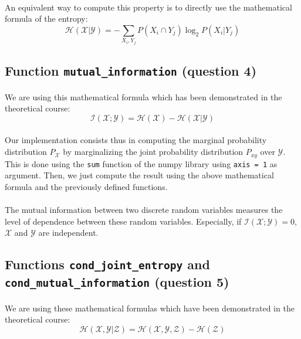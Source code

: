 \documentclass[a4paper, 11pt, oneside]{article}
\begin{document}
\paragraph{}An equivalent way to compute this property is to directly use the mathematical formula of the entropy:
$$ \mathcal{H}(\mathcal{X} | \mathcal{Y}) = - \sum_{X_i, Y_j} P(X_i \cap Y_j) \log_2{P(X_i | Y_j)} $$

\subsection{Function \texttt{mutual\_information} (question 4)}

\paragraph{}We are using this mathematical formula which has been demonstrated in the theoretical course: 
$$ \mathcal{I}(\mathcal{X}; \mathcal{Y}) = \mathcal{H}(\mathcal{X}) - \mathcal{H}(\mathcal{X}| \mathcal{Y})$$

\paragraph{}Our implementation consists thus in computing the marginal probability distribution $P_\mathcal{X}$ by marginalizing the joint probability distribution $P_{xy}$ over $\mathcal{Y}$. This is done using the \texttt{sum} function of the numpy library using \texttt{axis = 1} as argument. Then, we just compute the result using the above mathematical formula and the previously defined functions.

\paragraph{}The mutual information between two discrete random variables measures the level of dependence between these random variables. Especially, if $\mathcal{I}(\mathcal{X}; \mathcal{Y}) = 0$, $\mathcal{X}$ and $\mathcal{Y}$ are independent.

\subsection{Functions \texttt{cond\_joint\_entropy} and \texttt{cond\_mutual\_information} (question 5)}

\paragraph{}We are using these mathematical formulas which have been demonstrated in the theoretical course: 
$$ \mathcal{H}(\mathcal{X}, \mathcal{Y} | \mathcal{Z}) = \mathcal{H}(\mathcal{X}, \mathcal{Y}, \mathcal{Z}) - \mathcal{H}(\mathcal{Z})$$
\end{document}
